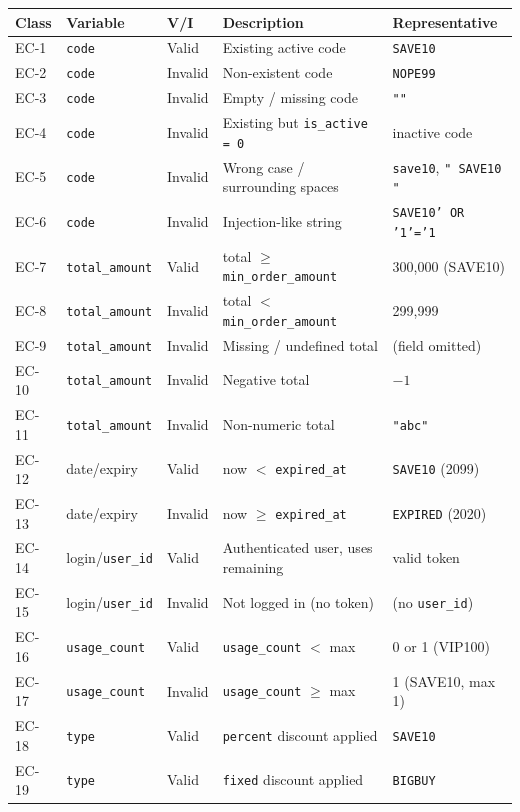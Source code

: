 \documentclass[11pt,a4paper]{article}
\newcommand{\code}[1]{\texttt{#1}}
\begin{document}
\begin{center}
\begin{longtable}{@{}C{1.3cm} L{2.6cm} C{1.5cm} L{5.3cm} L{3.0cm}@{}}
\toprule
\textbf{Class} & \textbf{Variable} & \textbf{V/I} & \textbf{Description} & \textbf{Representative} \\
\midrule
\endhead
EC-1  & \code{code}         & Valid   & Existing active code                     & \code{SAVE10} \\
EC-2  & \code{code}         & Invalid & Non-existent code                        & \code{NOPE99} \\
EC-3  & \code{code}         & Invalid & Empty / missing code                     & \code{""} \\
EC-4  & \code{code}         & Invalid & Existing but \code{is\_active = 0}       & inactive code \\
EC-5  & \code{code}         & Invalid & Wrong case / surrounding spaces          & \code{save10}, \code{" SAVE10 "} \\
EC-6  & \code{code}         & Invalid & Injection-like string                    & \code{SAVE10' OR '1'='1} \\
EC-7  & \code{total\_amount}& Valid   & total $\ge$ \code{min\_order\_amount}    & 300{,}000 (SAVE10) \\
EC-8  & \code{total\_amount}& Invalid & total $<$ \code{min\_order\_amount}      & 299{,}999 \\
EC-9  & \code{total\_amount}& Invalid & Missing / undefined total                & (field omitted) \\
EC-10 & \code{total\_amount}& Invalid & Negative total                           & $-1$ \\
EC-11 & \code{total\_amount}& Invalid & Non-numeric total                        & \code{"abc"} \\
EC-12 & date/expiry         & Valid   & now $<$ \code{expired\_at}               & \code{SAVE10} (2099) \\
EC-13 & date/expiry         & Invalid & now $\ge$ \code{expired\_at}             & \code{EXPIRED} (2020) \\
EC-14 & login/\code{user\_id}& Valid  & Authenticated user, uses remaining       & valid token \\
EC-15 & login/\code{user\_id}& Invalid& Not logged in (no token)                 & (no \code{user\_id}) \\
EC-16 & \code{usage\_count} & Valid   & \code{usage\_count} $<$ max              & 0 or 1 (VIP100) \\
EC-17 & \code{usage\_count} & Invalid & \code{usage\_count} $\ge$ max            & 1 (SAVE10, max 1) \\
EC-18 & \code{type}         & Valid   & \code{percent} discount applied          & \code{SAVE10} \\
EC-19 & \code{type}         & Valid   & \code{fixed} discount applied            & \code{BIGBUY} \\
\bottomrule
\end{longtable}
\end{center}
\end{document}
